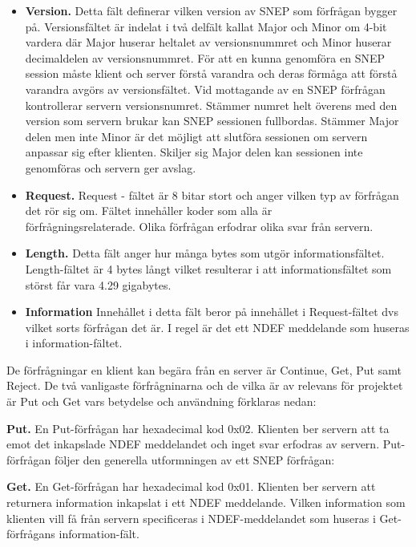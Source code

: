 \documentclass[11pt]{article}
\begin{document}
\begin{itemize}
\item \textbf{Version.} Detta fält definerar vilken version av SNEP som förfrågan bygger på. Versionsfältet är indelat i två delfält kallat Major och Minor om 4-bit vardera där Major huserar heltalet av versionsnummret och Minor huserar decimaldelen av versionsnummret. För att en kunna genomföra en SNEP session måste klient och server förstå varandra och deras förmåga att förstå varandra avgörs av versionsfältet. Vid mottagande av en SNEP förfrågan kontrollerar servern versionsnumret. Stämmer numret helt överens med den version som servern brukar kan SNEP sessionen fullbordas. Stämmer Major delen men inte Minor är det möjligt att slutföra sessionen om servern anpassar sig efter klienten. Skiljer sig Major delen kan sessionen inte genomföras och servern ger avslag.
\item \textbf{Request.} Request - fältet är 8 bitar stort och anger vilken typ av förfrågan det rör sig om. Fältet innehåller koder som alla är\\ förfrågningsrelaterade. Olika förfrågan erfodrar olika svar från servern.
\item \textbf{Length.} Detta fält anger hur många bytes som utgör informationsfältet. Length-fältet är 4 bytes långt vilket resulterar i att informationsfältet som störst får vara 4.29 gigabytes.
\item \textbf{Information} Innehållet i detta fält beror på innehållet i Request-fältet dvs vilket sorts förfrågan det är. I regel är det ett NDEF meddelande som huseras i information-fältet.
\end{itemize}

De förfrågningar en klient kan begära från en server är Continue, Get, Put samt Reject. De två vanligaste förfrågninarna och de vilka är av relevans för projektet är Put och Get vars betydelse och användning förklaras nedan:

\textbf{Put.} En Put-förfrågan har hexadecimal kod 0x02. Klienten ber servern att ta emot det inkapslade NDEF meddelandet och inget svar erfodras av servern.  Put-förfrågan följer den generella utformningen av ett SNEP förfrågan:


\textbf{Get.} En Get-förfrågan har hexadecimal kod 0x01. Klienten ber servern att returnera information inkapslat i ett NDEF meddelande. Vilken information som klienten vill få från servern specificeras i NDEF-meddelandet som huseras i Get-förfrågans information-fält. 
\end{document}
